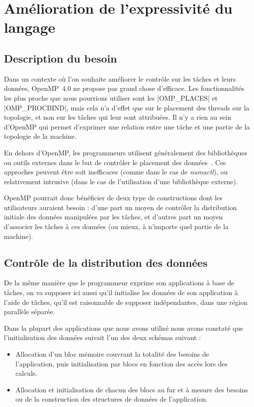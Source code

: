 \section{Amélioration de l'expressivité du langage}\label{sec:openmp:langage}

\subsection{Description du besoin}

Dans un contexte où l'on souhaite améliorer le contrôle sur les tâches et leurs données, OpenMP~4.0 ne propose pas grand chose d'efficace.
Les fonctionnalités les plus proche que nous pourrions utiliser sont les |OMP_PLACES| et |OMP_PROCBIND|, mais cela n'a d'effet que sur le placement des threads sur la topologie, et non sur les tâches qui leur sont attribuées. Il n'y a rien au sein d'OpenMP qui permet d'exprimer une relation entre une tâche et une partie de la topologie de la machine.

En dehors d'OpenMP, les programmeurs utilisent généralement des bibliothèques ou outils externes dans le but de contrôler le placement des données~\cite{Pousa2009, Broquedis2010a}.
Ces approches peuvent être soit inefficaces (comme dans le cas de \emph{numactl}), ou relativement intrusive (dans le cas de l'utilisation d'une bibliothèque externe).

OpenMP pourrait donc bénéficier de deux type de constructions dont les utilisateurs auraient besoin : d'une part un moyen de contrôler la distribution initiale des données manipulées par les tâches, et d'autres part un moyen d'associer les tâches à ces données (ou mieux, à n'importe quel partie de la machine).

\subsection{Contrôle de la distribution des données}

De la même manière que le programmeur exprime son applications à base de tâches, on va supposer ici aussi qu'il initialise les données de son application à l'aide de tâches, qu'il est raisonnable de supposer indépendantes, dans une région parallèle séparée.

Dans la plupart des applications que nous avons utilisé nous avons constaté que l'initialisation des données suivait l'un des deux schémas suivant :
\begin{itemize}
    \item Allocation d'un bloc mémoire couvrant la totalité des besoins de l'application, puis initialisation par blocs en fonction des accès lors des calculs.
  \item Allocation et initialisation de chacun des blocs au fur et à mesure des besoins ou de la construction des structures de données de l'application.
\end{itemize}

